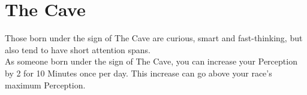 \section{The Cave}

Those born under the sign of The Cave are curious, smart and fast-thinking, but also tend to have short attention spans.\\
As someone born under the sign of The Cave, you can increase your Perception by 2 for 10 Minutes once per day. This increase can go above your race's maximum Perception.\\